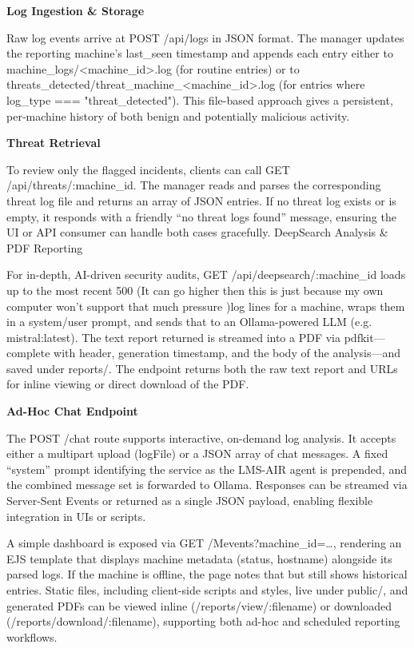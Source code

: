\textbf{Log Ingestion \& Storage}

Raw log events arrive at POST /api/logs in JSON format. The manager updates the reporting machine’s last_seen timestamp and appends each entry either to machine_logs/<machine_id>.log (for routine entries) or to threats_detected/threat_machine_<machine_id>.log (for entries where log_type === "threat_detected"). This file-based approach gives a persistent, per‐machine history of both benign and potentially malicious activity.


\textbf{Threat Retrieval}

To review only the flagged incidents, clients can call GET /api/threats/:machine_id. The manager reads and parses the corresponding threat log file and returns an array of JSON entries. If no threat log exists or is empty, it responds with a friendly “no threat logs found” message, ensuring the UI or API consumer can handle both cases gracefully.
DeepSearch Analysis \& PDF Reporting

For in-depth, AI-driven security audits, GET /api/deepsearch/:machine_id loads up to the most recent 500 (It can go higher then this is just because my own computer won't support that much pressure )log lines for a machine, wraps them in a system/user prompt, and sends that to an Ollama-powered LLM (e.g. mistral:latest). The text report returned is streamed into a PDF via pdfkit—complete with header, generation timestamp, and the body of the analysis—and saved under reports/. The endpoint returns both the raw text report and URLs for inline viewing or direct download of the PDF.

\textbf{Ad-Hoc Chat Endpoint}

The POST /chat route supports interactive, on-demand log analysis. It accepts either a multipart upload (logFile) or a JSON array of chat messages. A fixed “system” prompt identifying the service as the LMS-AIR agent is prepended, and the combined message set is forwarded to Ollama. Responses can be streamed via Server-Sent Events or returned as a single JSON payload, enabling flexible integration in UIs or scripts.

A simple dashboard is exposed via GET /Mevents?machine_id=…, rendering an EJS template that displays machine metadata (status, hostname) alongside its parsed logs. If the machine is offline, the page notes that but still shows historical entries. Static files, including client-side scripts and styles, live under public/, and generated PDFs can be viewed inline (/reports/view/:filename) or downloaded (/reports/download/:filename), supporting both ad-hoc and scheduled reporting workflows.




























